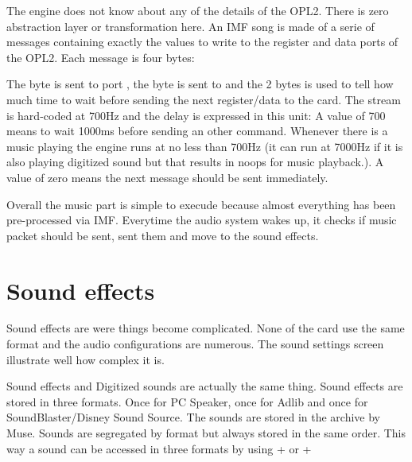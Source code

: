\par
The engine does not know about any of the details of the OPL2. There is zero abstraction layer or transformation here. An IMF song is made of a serie of messages containing exactly the values to write to the register and data ports of the OPL2. Each message is four bytes:\\
\par
\begin{minipage}{\textwidth}

\end{minipage}
\par
The  byte is sent to port , the  byte is sent to  and the  2 bytes is used to tell how much time to wait before sending the next register/data to the card. The stream is hard-coded at 700Hz and the delay is expressed in this unit: A value of 700 means to wait 1000ms before sending an other command. Whenever there is a music playing the engine runs at no less than 700Hz (it can run at 7000Hz if it is also playing digitized sound but that results in noops for music playback.). A value of zero means the next message should be sent immediately.\\
\par
Overall the music part is simple to execude because almost everything has been pre-processed via IMF. Everytime the audio system wakes up, it checks if music packet should be sent, sent them and move to the sound effects.










\section{Sound effects}
Sound effects are were things become complicated. None of the card use the same format and
the audio configurations are numerous. The sound settings screen illustrate well how complex it is.
\par
\begin{figure}[H]
\centering
 \end{figure}
\par
Sound effects and Digitized sounds are actually the same thing. Sound effects are stored in three formats. Once for PC Speaker, once for Adlib and once for SoundBlaster/Disney Sound Source. The sounds are stored in the  archive by Muse. Sounds are segregated by format but always stored in the same order. This way a sound can be accessed in three formats by using  +  or  + \\

